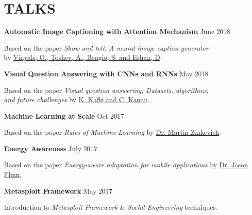 \documentclass[margin, 10pt]{res} %
\begin{document}
\section{TALKS} 

\textbf{Automatic Image Captioning with Attention Mechanism}
\hfill {June 2018}
\vspace{0.15cm}
\begin{innerlist}
	\item Based on the paper \textit{Show and tell: A 	neural image caption generator}\\ by \href{http://www.jmlr.org/proceedings/papers/v37/xuc15.pdf}{Vinyals, O., Toshev, A., Bengio, S. and Erhan, D}.
\end{innerlist}

\textbf{Visual Question Answering with CNNs and RNNs}
\hfill {May 2018}
\vspace{0.15cm}
\begin{innerlist}
	\item Based on the paper \textit{Visual question answering: Datasets, algorithms,\\ and 	future challenges} by \href{https://www.sciencedirect.com/science/article/pii/S1077314217301170}{K. Kafle and C. Kanan}.
\end{innerlist}


\textbf{Machine Learning at Scale}
\hfill {Oct 2017}
\vspace{0.15cm}
\begin{innerlist}
	\item Based on the paper \textit{Rules of Machine Learning} by \href{http://martin.zinkevich.org/rules_of_ml/rules_of_ml.pdf}{Dr. Martin Zinkevich}.
\end{innerlist}

\textbf{Energy Awareness}
\hfill {July 2017}
\vspace{0.15cm}
\begin{innerlist}
	\item Based on the paper \textit{Energy-aware adaptation for mobile applications} by \href{http://www-cgi.cs.cmu.edu/afs/cs.cmu.edu/Web/People/odyssey/docdir/s17.pdf5}{Dr. Jason Flinn}.
\end{innerlist}

\textbf{Metasploit Framework}
\hfill {May 2017}
\vspace{0.15cm}
\begin{innerlist}
	\item Introduction to \textit{Metasploit Framework} \& \textit{Social Engineering} techniques.
\end{innerlist}
\end{document}
